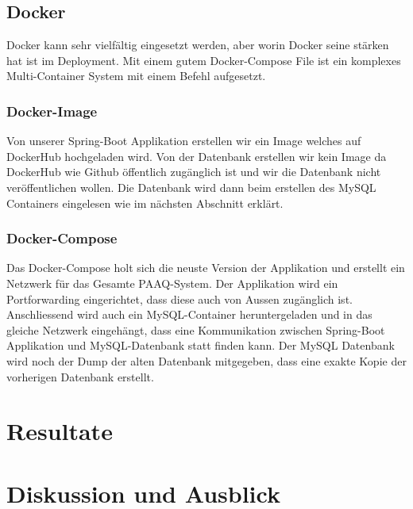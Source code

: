 \documentclass[a4paper]{article}
\begin{document}
	\subsection{Docker}
	Docker kann sehr vielfältig eingesetzt werden, aber worin Docker seine stärken hat ist im Deployment. Mit einem gutem Docker-Compose File ist ein komplexes Multi-Container System mit einem Befehl aufgesetzt.
	
	\subsubsection{Docker-Image}
	Von unserer Spring-Boot Applikation erstellen wir ein Image welches auf DockerHub hochgeladen wird. Von der Datenbank erstellen wir kein Image da DockerHub wie Github öffentlich zugänglich ist und wir die Datenbank nicht veröffentlichen wollen. Die Datenbank wird dann beim erstellen des MySQL Containers eingelesen wie im nächsten Abschnitt erklärt.
	
	\subsubsection{Docker-Compose}
	Das Docker-Compose holt sich die neuste Version der Applikation und erstellt ein Netzwerk für das Gesamte PAAQ-System. Der Applikation wird ein Portforwarding eingerichtet, dass diese auch von Aussen zugänglich ist. Anschliessend wird auch ein MySQL-Container heruntergeladen und in das gleiche Netzwerk eingehängt, dass eine Kommunikation zwischen Spring-Boot Applikation und MySQL-Datenbank statt finden kann. Der MySQL Datenbank wird noch der Dump der alten Datenbank mitgegeben, dass eine exakte Kopie der vorherigen Datenbank erstellt.
	
	\section{Resultate}
	\section{Diskussion und Ausblick}
	
\end{document}
